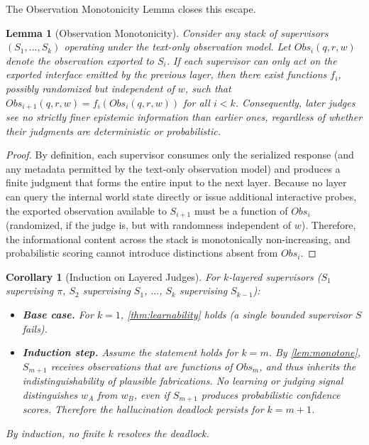 \documentclass[11pt]{article}
\newtheorem{lemma}[theorem]{Lemma}
\newtheorem{corollary}[theorem]{Corollary}
\begin{document}
The Observation Monotonicity Lemma closes this escape.

\begin{lemma}[Observation Monotonicity]\label{lem:monotone}
Consider any stack of supervisors $(S_1,\dots,S_k)$ operating under the
text-only observation model. Let $Obs_i(q,r,w)$ denote the observation exported
to $S_i$. If each supervisor can only act on the exported interface emitted by
the previous layer, then there exist functions $f_i$, possibly randomized but
independent of $w$, such that
$Obs_{i+1}(q,r,w) = f_i(Obs_i(q,r,w))$ for all $i < k$. Consequently, later
judges see no strictly finer epistemic information than earlier ones, regardless
of whether their judgments are deterministic or probabilistic.
\end{lemma}

\begin{proof}
By definition, each supervisor consumes only the serialized response (and any
metadata permitted by the text-only observation model) and produces a finite
judgment that forms the entire input to the next layer. Because no layer can
query the internal world state directly or issue additional interactive probes,
the exported observation available to $S_{i+1}$ must be a function of $Obs_i$
(randomized, if the judge is, but with randomness independent of $w$). Therefore, the informational content across the stack is
monotonically non-increasing, and probabilistic scoring cannot introduce
distinctions absent from $Obs_i$.
\end{proof}

\begin{corollary}[Induction on Layered Judges]\label{cor:layered}
For $k$-layered supervisors ($S_1$ supervising $\pi$, $S_2$ supervising $S_1$,
$\dots$, $S_k$ supervising $S_{k-1}$):
\begin{itemize}
\item \textbf{Base case.} For $k=1$, \autoref{thm:learnability} holds (a
  single bounded supervisor $S$ fails).
\item \textbf{Induction step.} Assume the statement holds for $k=m$. By
  \autoref{lem:monotone}, $S_{m+1}$ receives observations that are
  functions of $Obs_m$, and thus inherits the indistinguishability of
  plausible fabrications. No learning
  or judging signal distinguishes $w_A$ from $w_B$, even if $S_{m+1}$ produces
  probabilistic confidence scores. Therefore the hallucination deadlock persists
  for $k=m+1$.
\end{itemize}
By induction, no finite $k$ resolves the deadlock.
\end{corollary}
\end{document}
